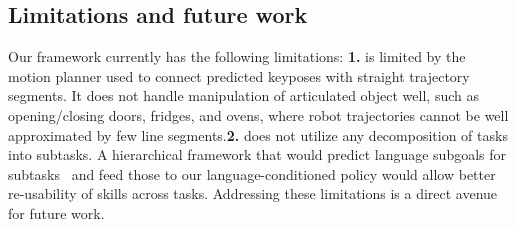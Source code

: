 \subsection{Limitations and future work}
Our framework currently has the following limitations: 
\textbf{1.} 
\model{} is limited by the motion planner used to connect predicted  keyposes with straight trajectory segments. It does not handle manipulation of articulated object  well, such as opening/closing doors, fridges, and ovens, where robot trajectories cannot be well approximated by few line segments.\textbf{2.} 
\model{}  does not utilize any  decomposition of tasks into subtasks.
A hierarchical framework that would predict language subgoals for subtasks~\cite{ahn2022can, huang2023grounded, lin2023text2motion} and feed those to our language-conditioned policy would allow better re-usability of skills across tasks. Addressing these limitations is a direct avenue for future work. 





